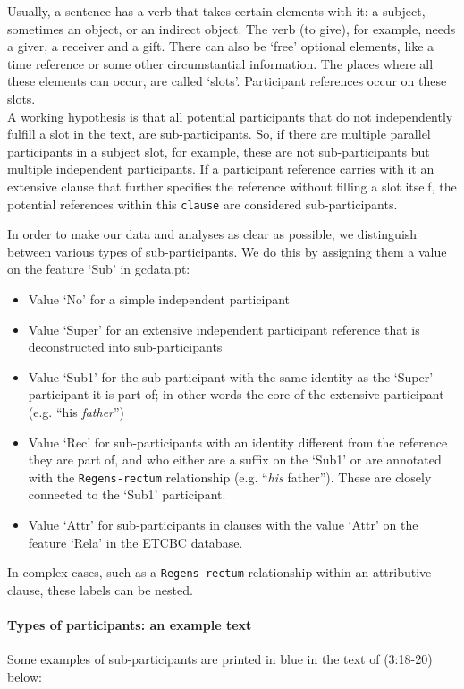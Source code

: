 \documentclass{report}
\newcommand{\mi}[1]{\lstinline{#1}}
\newcommand{\hebr}[1]{\cjRL{#1}}
\begin{document}
Usually, a sentence has a verb that takes certain elements with it: a subject, sometimes an object, or an indirect object. The verb \hebr{NTN} (to give), for example, needs a giver, a receiver and a gift. There can also be `free' optional elements, like a time reference or some other circumstantial information. The places where all these elements can occur, are called `slots'. Participant references occur on these slots. \\
A working hypothesis is that all potential participants that do not independently fulfill a slot in the text, are sub-participants. So, if there are multiple parallel participants in a subject slot, for example, these are not sub-participants but multiple independent participants. If a participant reference carries with it an extensive clause that further specifies the reference without filling a slot itself, the potential references within this \mi{clause} are considered sub-participants.

In order to make our data and analyses as clear as possible, we distinguish between various types of sub-participants. We do this by assigning them a value on the feature `Sub' in gcdata.pt:
\begin{itemize}
\item Value `No' for a simple independent participant
\item Value `Super' for an extensive independent participant reference that is deconstructed into sub-participants
\item Value `Sub1' for the sub-participant with the same identity as the `Super' participant it is part of; in other words the core of the extensive participant (e.g. ``his \emph{father}'')
\item Value `Rec' for sub-participants with an identity different from the reference they are part of, and who either are a suffix on the `Sub1' or are annotated with the \mi{Regens-rectum} relationship (e.g. ``\emph{his} father''). These are closely connected to the `Sub1' participant.
\item Value `Attr' for sub-participants in clauses with the value `Attr' on the feature `Rela' in the ETCBC database.
\end{itemize}

In complex cases, such as a \mi{Regens-rectum} relationship within an attributive clause, these labels can be nested.

\paragraph{Types of participants: an example text}
Some examples of sub-participants are printed in blue in the text of (3:18-20) below:\\
\end{document}
